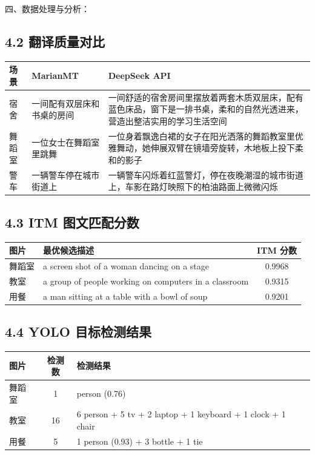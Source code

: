 \documentclass[12pt, a4paper]{article}
\begin{document}
\begin{labbox}{四、数据处理与分析：}{}
\subsection*{4.2 翻译质量对比}

\begin{center}
\small
\begin{tabular}{|p{2cm}|p{6cm}|p{6cm}|}
    \hline
    \textbf{场景} & \textbf{MarianMT} & \textbf{DeepSeek API} \\
    \hline
    宿舍 &
    一间配有双层床和书桌的房间 &
    一间舒适的宿舍房间里摆放着两套木质双层床，配有蓝色床品，窗下是一排书桌，柔和的自然光透进来，营造出整洁实用的学习生活空间 \\
    \hline
    舞蹈室 &
    一位女士在舞蹈室里跳舞 &
    一位身着飘逸白裙的女子在阳光洒落的舞蹈教室里优雅舞动，她伸展双臂在镜墙旁旋转，木地板上投下柔和的影子 \\
    \hline
    警车 &
    一辆警车停在城市街道上 &
    一辆警车闪烁着红蓝警灯，停在夜晚潮湿的城市街道上，车影在路灯映照下的柏油路面上微微闪烁 \\
    \hline
\end{tabular}
\end{center}

\subsection*{4.3 ITM 图文匹配分数}

\begin{center}
\begin{tabular}{|p{2.5cm}|p{7cm}|c|}
    \hline
    \textbf{图片} & \textbf{最优候选描述} & \textbf{ITM 分数} \\
    \hline
    舞蹈室 & a screen shot of a woman dancing on a stage & 0.9968 \\
    教室 & a group of people working on computers in a classroom & 0.9315 \\
    用餐 & a man sitting at a table with a bowl of soup & 0.9201 \\
    \hline
\end{tabular}
\end{center}

\subsection*{4.4 YOLO 目标检测结果}

\begin{center}
\begin{tabular}{|p{2.5cm}|c|p{8cm}|}
    \hline
    \textbf{图片} & \textbf{检测数} & \textbf{检测结果} \\
    \hline
    舞蹈室 & 1 & person (0.76) \\
    教室 & 16 & 6 person + 5 tv + 2 laptop + 1 keyboard + 1 clock + 1 chair \\
    用餐 & 5 & 1 person (0.93) + 3 bottle + 1 tie \\
    \hline
\end{tabular}
\end{center}


\end{labbox}
\end{document}
